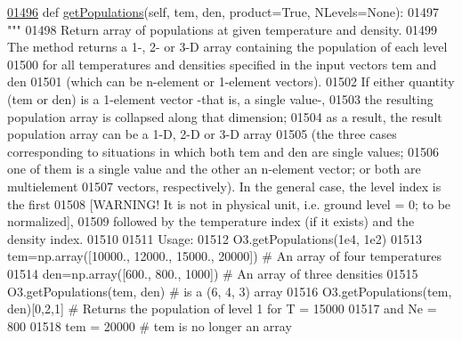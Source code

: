 \begin{DoxyCode}
\hypertarget{classpyneb_1_1core_1_1pynebcore_1_1_atom_l01496}{}\hyperlink{classpyneb_1_1core_1_1pynebcore_1_1_atom_aab7496403c8aaef40ab3b20b5c00e9f0}{01496}     \textcolor{keyword}{def }\hyperlink{classpyneb_1_1core_1_1pynebcore_1_1_atom_aab7496403c8aaef40ab3b20b5c00e9f0}{getPopulations}(self, tem, den, product=True, NLevels=None):
01497         \textcolor{stringliteral}{"""}
01498 \textcolor{stringliteral}{        Return array of populations at given temperature and density.}
01499 \textcolor{stringliteral}{        The method returns a 1-, 2- or 3-D array containing the population of each level }
01500 \textcolor{stringliteral}{            for all temperatures and densities specified in the input vectors tem and den }
01501 \textcolor{stringliteral}{            (which can be n-element or 1-element vectors).}
01502 \textcolor{stringliteral}{        If either quantity (tem or den) is a 1-element vector -that is, a single value-, }
01503 \textcolor{stringliteral}{            the resulting population array is collapsed along that dimension; }
01504 \textcolor{stringliteral}{            as a result, the result population array can be a 1-D, 2-D or 3-D array }
01505 \textcolor{stringliteral}{            (the three cases corresponding to situations in which both tem and den are single values; }
01506 \textcolor{stringliteral}{            one of them is a single value and the other an n-element vector; or both are multielement }
01507 \textcolor{stringliteral}{            vectors, respectively). In the general case, the level index is the first }
01508 \textcolor{stringliteral}{            [WARNING! It is not in physical unit, i.e. ground level = 0; to be normalized], }
01509 \textcolor{stringliteral}{            followed by the temperature index (if it exists) and the density index. }
01510 \textcolor{stringliteral}{}
01511 \textcolor{stringliteral}{        Usage:}
01512 \textcolor{stringliteral}{            O3.getPopulations(1e4, 1e2)}
01513 \textcolor{stringliteral}{            tem=np.array([10000., 12000., 15000., 20000]) # An array of four temperatures}
01514 \textcolor{stringliteral}{            den=np.array([600., 800., 1000])      # An array of three densities}
01515 \textcolor{stringliteral}{            O3.getPopulations(tem, den)           # is a (6, 4, 3) array}
01516 \textcolor{stringliteral}{            O3.getPopulations(tem, den)[0,2,1]    # Returns the population of level 1 for T = 15000 }
01517 \textcolor{stringliteral}{                                                    and Ne = 800}
01518 \textcolor{stringliteral}{            tem = 20000                           # tem is no longer an array}

\end{DoxyCode}

